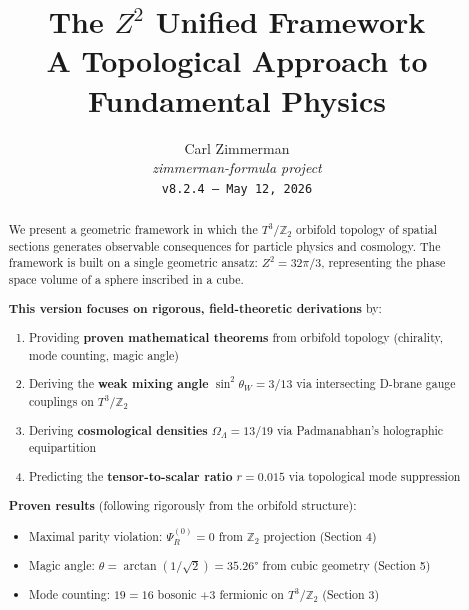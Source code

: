 \documentclass[12pt,a4paper]{article}
\newcommand{\Ztwo}{\mathbb{Z}_2}
\newcommand{\Tthree}{T^3}
\newcommand{\OmegaL}{\Omega_\Lambda}
\newcommand{\sinW}{\sin^2\theta_W}
\newcommand{\Zsq}{Z^2}
\begin{document}
\title{\textbf{The $Z^2$ Unified Framework}\\[0.5em]
\large A Topological Approach to Fundamental Physics}

\author{Carl Zimmerman\\[0.5em]
\small\textit{zimmerman-formula project}\\
\small\texttt{v8.2.4 --- May 12, 2026}}

\date{}

\maketitle

\begin{abstract}

We present a geometric framework in which the $\Tthree/\Ztwo$ orbifold topology of spatial sections generates observable consequences for particle physics and cosmology. The framework is built on a single geometric ansatz: $\Zsq = 32\pi/3$, representing the phase space volume of a sphere inscribed in a cube.

\textbf{This version focuses on rigorous, field-theoretic derivations} by:
\begin{enumerate}[itemsep=0pt]
    \item Providing \textbf{proven mathematical theorems} from orbifold topology (chirality, mode counting, magic angle)
    \item Deriving the \textbf{weak mixing angle} $\sinW = 3/13$ via intersecting D-brane gauge couplings on $\Tthree/\Ztwo$
    \item Deriving \textbf{cosmological densities} $\OmegaL = 13/19$ via Padmanabhan's holographic equipartition
    \item Predicting the \textbf{tensor-to-scalar ratio} $r = 0.015$ via topological mode suppression
\end{enumerate}

\textbf{Proven results} (following rigorously from the orbifold structure):
\begin{itemize}[itemsep=0pt]
    \item Maximal parity violation: $\Psi_R^{(0)} = 0$ from $\Ztwo$ projection (Section 4)
    \item Magic angle: $\theta = \arctan(1/\sqrt{2}) = 35.26°$ from cubic geometry (Section 5)
    \item Mode counting: $19 = 16$ bosonic $+ 3$ fermionic on $\Tthree/\Ztwo$ (Section 3)
\end{itemize}


\end{abstract}
\end{document}
